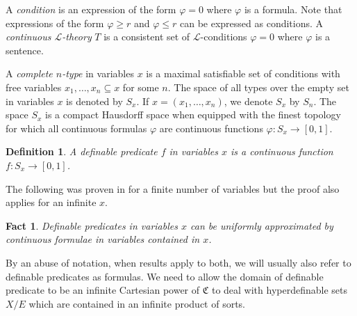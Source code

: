 \documentclass{amsart}
\newtheorem{fact}[teor]{Fact}
\newtheorem{defin}[teor]{Definition}
\newtheorem{external claim}[teor]{Claim}
\newcommand{\C}{{\mathfrak C}}
\newcommand{\mL}{\mathcal{L}}
\DeclareMathOperator{\tp}{{tp}}
\begin{document}
A \emph{condition} is an expression of the form $\varphi=0$ where $\varphi$ is a formula. Note that expressions of the form $\varphi\geq r$ and $\varphi\leq r$ can be expressed as conditions. A \emph{continuous $\mL$-theory} $T$ is a consistent set of $\mL$-conditions $\varphi=0$ where $\varphi$ is a sentence.

A \emph{complete $n$-type} in variables $x$ is a maximal satisfiable set of conditions with free variables $x_1,\dots,x_n\subseteq x$ for some $n$. The space of all types over the empty set in variables $x$ is denoted by $S_{x}$. If $x=(x_1,\dots,x_n)$, we denote $S_{x}$ by $S_{n}$. The space $S_{x}$ is a compact Hausdorff space when equipped with the finest topology for which all continuous formulas $\varphi$ are continuous functions $\varphi:S_{x}\to[0,1]$.


\begin{defin}
    A \emph{definable predicate} $f$ in variables $x$ is a continuous function $f:S_{x}\to[0,1]$.
\end{defin}

The following was proven in \cite[Proposition 3.4]{MR2657678} for a finite number of variables but the proof also applies for an infinite $x$.

\begin{fact}
    Definable predicates in variables $x$ can be uniformly approximated by continuous formulae in variables contained in $x$.
\end{fact}

By an abuse of notation, when results apply to both, we will usually also refer to definable predicates as formulas. We need to allow the domain of definable predicate to be an infinite Cartesian power of $\C$ to deal with hyperdefinable sets $X/E$ which are contained in an infinite product of sorts. %

\end{document}
